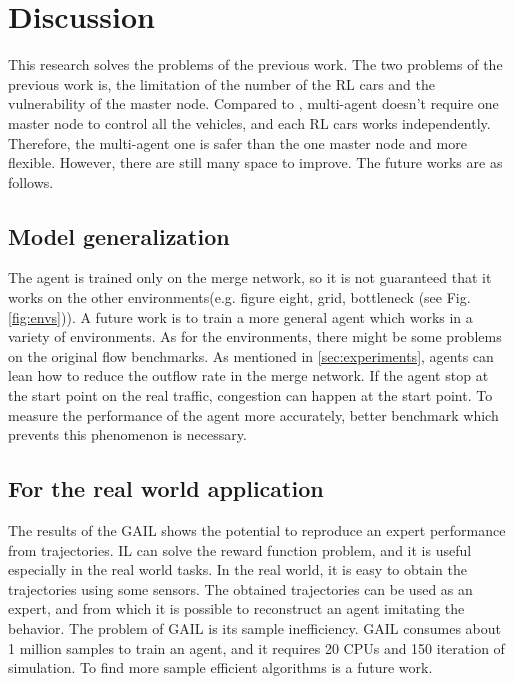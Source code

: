 \section{Discussion}\label{sec:discussion}

This research solves the problems of the previous work\cite{Kreidieh2018}. The two problems of the previous work is, the limitation of the number of the RL cars and the vulnerability of the master node. Compared to \cite{Kreidieh2018}, multi-agent doesn't require one master node to control all the vehicles, and each RL cars works independently. Therefore, the multi-agent one is safer than the one master node and more flexible. However, there are still many space to improve. The future works are as follows.

\subsection{Model generalization}
The agent is trained only on the merge network, so it is not guaranteed that it works on the other environments(e.g. figure eight, grid, bottleneck (see Fig. \ref{fig:envs})). A future work is to train a more general agent which works in a variety of environments. As for the environments, there might be some problems on the original flow benchmarks. As mentioned in \ref{sec:experiments}, agents can lean how to reduce the outflow rate in the merge network. If the agent stop at the start point on the real traffic, congestion can happen at the start point. To measure the performance of the agent more accurately, better benchmark which prevents this phenomenon is necessary.

\subsection{For the real world application}
The results of the GAIL shows the potential to reproduce an expert performance from trajectories. IL can solve the reward function problem, and it is useful especially in the real world tasks. In the real world, it is easy to obtain the trajectories using some sensors. The obtained trajectories can be used as an expert, and from which it is possible to reconstruct an agent imitating the behavior. The problem of GAIL is its sample inefficiency. GAIL consumes about 1 million samples to train an agent, and it requires 20 CPUs and 150 iteration of simulation. To find more sample efficient algorithms is a future work.

